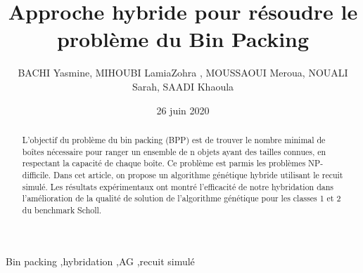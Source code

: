 \documentclass[preprint,12pt]{elsarticle}
\begin{document}
\begin{frontmatter}



\title{Approche hybride pour résoudre le problème du Bin Packing}


\author{BACHI Yasmine, MIHOUBI LamiaZohra , MOUSSAOUI Meroua, NOUALI Sarah, SAADI Khaoula}

\address{Ecole nationale Supérieure d'Informatique -ESI-Alger}
\date{26 juin 2020}
\begin{abstract}
L’objectif du problème du bin packing (BPP) est de trouver le nombre minimal de boîtes nécessaire pour ranger un ensemble de n objets ayant des tailles connues, en respectant la capacité de chaque boîte. Ce problème est parmis les problèmes NP-difficile. Dans cet article, on propose un algorithme génétique  hybride utilisant le recuit simulé. Les résultats expérimentaux   ont montré l’efficacité de notre hybridation dans l’amélioration de la qualité de solution de l’algorithme génétique pour les classes 1 et 2 du benchmark Scholl. \end{abstract}

\begin{keyword}
Bin packing \sep hybridation \sep AG \sep recuit simulé 

\end{keyword}

\end{frontmatter}
\end{document}
